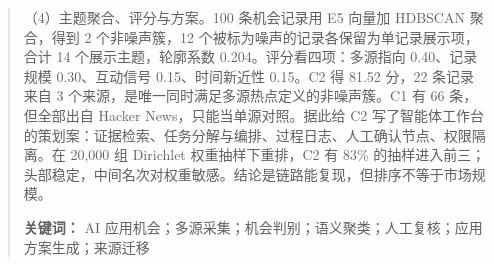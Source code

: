 \documentclass[UTF8,a4paper,11pt,fontset=fandol]{ctexart}
\begin{document}
\begin{abstract}
（4）主题聚合、评分与方案。100 条机会记录用 E5 向量加 HDBSCAN 聚合，得到 2 个非噪声簇，12 个被标为噪声的记录各保留为单记录展示项，合计 14 个展示主题，轮廓系数 0.204。评分看四项：多源指向 0.40、记录规模 0.30、互动信号 0.15、时间新近性 0.15。C2 得 81.52 分，22 条记录来自 3 个来源，是唯一同时满足多源热点定义的非噪声簇。C1 有 66 条，但全部出自 Hacker News，只能当单源对照。据此给 C2 写了智能体工作台的策划案：证据检索、任务分解与编排、过程日志、人工确认节点、权限隔离。在 20,000 组 Dirichlet 权重抽样下重排，C2 有 83\% 的抽样进入前三；头部稳定，中间名次对权重敏感。结论是链路能复现，但排序不等于市场规模。

\noindent\textbf{关键词：} AI 应用机会；多源采集；机会判别；语义聚类；人工复核；应用方案生成；来源迁移
\end{abstract}
\clearpage
\begingroup
\small
\linespread{1.0}\selectfont
\tableofcontents
\endgroup
\clearpage
{}
\listoffigures
\clearpage
{}
\listoftables
\clearpage








\clearpage



\end{document}
